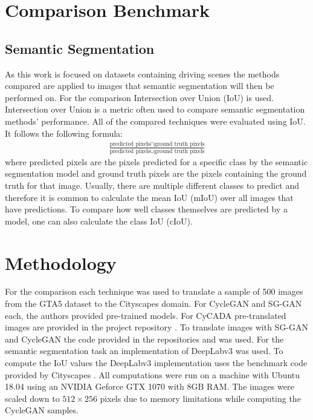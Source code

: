 \section{Comparison Benchmark}
\subsection{Semantic Segmentation}
As this work is focused on datasets containing driving scenes the methods compared are applied to images that semantic segmentation will then be performed on. For the comparison Intersection over Union (IoU) is used. Intersection over Union is a metric often used to compare semantic segmentation methods' performance. All of the compared techniques were evaluated using IoU. It follows the following formula:
\begin{align*}
	\frac{\text{predicted pixels} \cap \text{ground truth pixels}}{\text{predicted pixels} \cup \text{ground truth pixels}}
\end{align*}
where predicted pixels are the pixels predicted for a specific class by the semantic segmentation model and ground truth pixels are the pixels containing the ground truth for that image. Usually, there are multiple different classes to predict and therefore it is common to calculate the mean IoU (mIoU) over all images that have predictions. To compare how well classes themselves are predicted by a model, one can also calculate the class IoU (cIoU).

\section{Methodology}
For the comparison each technique was used to translate a sample of 500 images from the GTA5 dataset to the Cityscapes domain. For CycleGAN and SG-GAN each, the authors provided pre-trained models. For CyCADA pre-translated images are provided in the project repository \cite{CyCADA}. To translate images with SG-GAN and CycleGAN the code provided in the repositories \cite{SG} and \cite{Cycle} was used. For the semantic segmentation task an implementation \cite{DLR} of DeepLabv3 \cite{DBLP:journals/corr/ChenPSA17} was used. To compute the IoU values the DeepLabv3 implementation uses the benchmark code provided by Cityscapes \cite{CSR}. All computations were run on a machine with Ubuntu 18.04 using an NVIDIA Geforce GTX 1070 with 8GB RAM. The images were scaled down to $512 \times 256$ pixels due to memory limitations while computing the CycleGAN samples.

